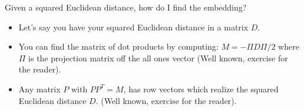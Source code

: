  \begin{frame}{Given a squared Euclidean distance, how do I find the
   embedding?}
   \begin{itemize}
   \item Let's say you have your squared Euclidean distance in a matrix
   $D$.
   \item You can find the matrix of dot products by computing: 
   $ M = -\Pi D \Pi / 2$ where $\Pi$ is the projection matrix off the all
   ones vector (Well known, exercise for the reader).
   \item Any matrix $P$ with $PP^T = M$, has row vectors which realize
   the squared Euclidean distance $D$. (Well known, exercise for the
       reader).
   \end{itemize}
 \end{frame}

